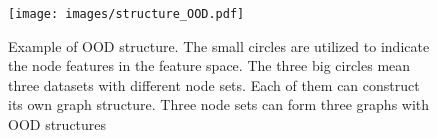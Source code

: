 \begin{figure}[th]
    \centering
    \texttt{[image: images/structure\_OOD.pdf]}
     \caption{Example of OOD structure. The small circles are utilized to indicate the node features in the feature space. The three big circles mean three datasets with different node sets. Each of them can construct its own graph structure. Three node sets can form three graphs with OOD structures  }%
    \label{fig:node_space}
\end{figure}